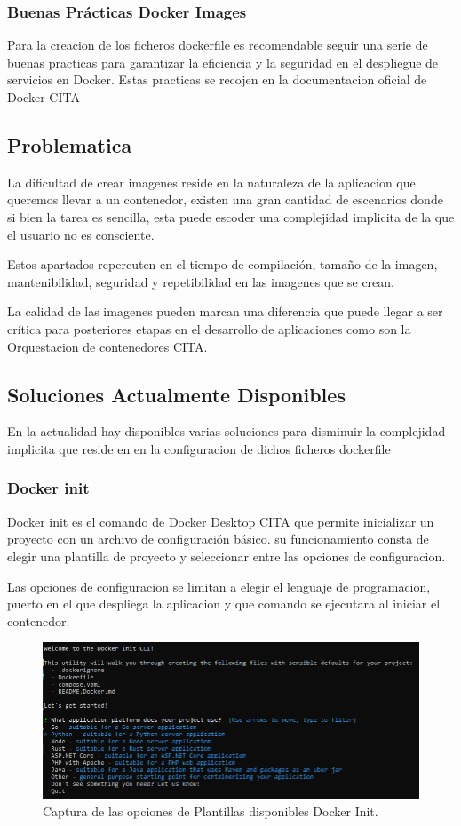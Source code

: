 \documentclass[12pt, a4paper, twoside]{article}
\begin{document}
\subsubsection{Buenas Prácticas Docker Images}
Para la creacion de los ficheros dockerfile es recomendable seguir una serie de buenas practicas para garantizar la eficiencia y la seguridad en el despliegue de servicios en Docker.
Estas practicas se recojen en la documentacion oficial de Docker CITA
\subsection{Problematica}
La dificultad de crear imagenes reside en la naturaleza de la aplicacion que queremos llevar a un contenedor, existen una gran cantidad de escenarios donde si bien la tarea es sencilla, esta puede escoder una complejidad implicita
de la que el usuario no es consciente. 

Estos apartados repercuten en el tiempo de compilación, tamaño de la imagen, mantenibilidad, seguridad y repetibilidad en las imagenes que se crean.

La calidad de las imagenes pueden marcan una diferencia que puede llegar a ser crítica para posteriores etapas en el desarrollo de aplicaciones como son la Orquestacion de contenedores CITA.

\subsection{Soluciones Actualmente Disponibles}
En la actualidad hay disponibles varias soluciones para disminuir la complejidad implicita que reside en en la configuracion de dichos ficheros dockerfile 
\subsubsection{Docker init}
Docker init es el comando de Docker Desktop CITA que permite inicializar un proyecto con un archivo de configuración básico.
su funcionamiento consta de elegir una plantilla de proyecto y seleccionar entre las opciones de configuracion.

Las opciones de configuracion se limitan a elegir el lenguaje de programacion, puerto en el que despliega la aplicacion y que comando se ejecutara al iniciar el contenedor.

\begin{figure}[ht]
  \centering
    \includegraphics[width=1\textwidth]{Docker Init.png}
  \caption{Captura de las opciones de Plantillas disponibles Docker Init.}
\end{figure}
\end{document}
